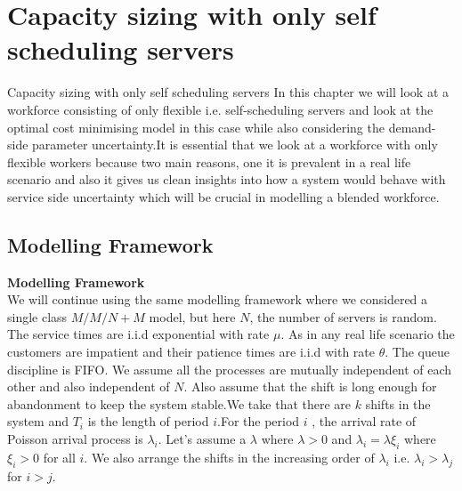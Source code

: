 \documentclass[8pt]{beamer}
\begin{document}
\section{Capacity sizing with only self scheduling servers}
\begin{frame}{Capacity sizing with only self scheduling servers}
    In this chapter we will look at a workforce consisting of only flexible i.e. self-scheduling servers and look at the optimal cost minimising model in this case while also considering the demand-side parameter uncertainty.It is essential that we look at a workforce with only flexible workers because two main reasons, one it is prevalent in a real life scenario and also it gives us clean insights into  how a system would behave with service side uncertainty which will be crucial in modelling a blended workforce.
    \bigskip
    \subsection{Modelling Framework}
    \textbf{Modelling Framework}\\
     We will continue using the same modelling framework where we considered a single class $M/M/N +M$ model, but here $N$, the number of servers is random. The service times are i.i.d exponential with rate $\mu$. As in any real life scenario the customers are impatient and their patience times are i.i.d with rate $\theta$. The queue discipline is FIFO. We assume all the processes are mutually independent of each other and also independent of $N$. Also assume that the shift is long enough for abandonment to keep the system stable.We take that there are $k$ shifts in the system and $T_i$ is the length of period $i$.For the period $i$ , the arrival rate of Poisson arrival process is $\lambda_i$. Let's assume a $\lambda$ where $\lambda>0$ and $\lambda_i=\lambda \xi_i$ where $\xi_i >0$ for all $i$. We also arrange the shifts in the increasing order of $\lambda_i$ i.e. $ \lambda_i >\lambda_j$ for $i>j$. 
\end{frame}
\end{document}
